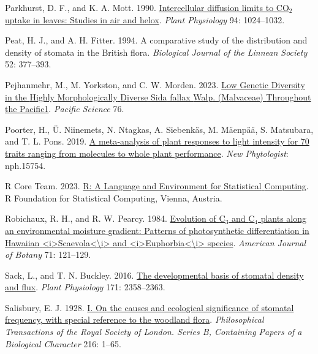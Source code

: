 \documentclass[
  letterpaper,
  DIV=11,
  numbers=noendperiod]{scrartcl}
\newlength{\cslhangindent}
\newlength{\cslentryspacingunit} %
\newenvironment{CSLReferences}[2] %
 {%
  \setlength{\parindent}{0pt}
  \ifodd #1
  \let\oldpar\par
  \def\par{\hangindent=\cslhangindent\oldpar}
  \fi
  \setlength{\parskip}{#2\cslentryspacingunit}
 }%
 {}
\begin{document}
\begin{CSLReferences}{1}{0}
\leavevmode{}%
Parkhurst, D. F., and K. A. Mott. 1990.
\href{https://doi.org/10.1104/pp.94.3.1024}{Intercellular diffusion
limits to {CO}\(_{\textrm{2}}\) uptake in leaves: Studies in air and
helox}. \emph{Plant Physiology} 94: 1024--1032.

\leavevmode{}%
Peat, H. J., and A. H. Fitter. 1994. A comparative study of the
distribution and density of stomata in the {British} flora.
\emph{Biological Journal of the Linnean Society} 52: 377--393.

\leavevmode{}%
Pejhanmehr, M., M. Yorkston, and C. W. Morden. 2023.
\href{https://doi.org/10.2984/76.4.2}{Low {Genetic} {Diversity} in the
{Highly} {Morphologically} {Diverse} {Sida} fallax {Walp}. ({Malvaceae})
{Throughout} the {Pacific1}}. \emph{Pacific Science} 76.

\leavevmode{}%
Poorter, H., Ü. Niinemets, N. Ntagkas, A. Siebenkäs, M. Mäenpää, S.
Matsubara, and T. L. Pons. 2019.
\href{https://doi.org/10.1111/nph.15754}{A meta‐analysis of plant
responses to light intensity for 70 traits ranging from molecules to
whole plant performance}. \emph{New Phytologist}: nph.15754.

\leavevmode{}%
R Core Team. 2023. \href{http://www.R-project.org/}{R: {A} {Language}
and {Environment} for {Statistical} {Computing}}. R Foundation for
Statistical Computing, Vienna, Austria.

\leavevmode{}%
Robichaux, R. H., and R. W. Pearcy. 1984.
\href{https://doi.org/10.1002/j.1537-2197.1984.tb12492.x}{Evolution of
{C}\(_{\textrm{3}}\) and {C}\(_{\textrm{4}}\) plants along an
environmental moisture gradient: Patterns of photosynthetic
differentiation in {Hawaiian}
{\textless{}}i{\textgreater{}}{Scaevola}{\textless{}}{\textbackslash{}}i{\textgreater{}}
and
{\textless{}}i{\textgreater{}}{Euphorbia}{\textless{}}{\textbackslash{}}i{\textgreater{}}
species}. \emph{American Journal of Botany} 71: 121--129.

\leavevmode{}%
Sack, L., and T. N. Buckley. 2016.
\href{https://doi.org/10.1104/pp.16.00476}{The developmental basis of
stomatal density and flux}. \emph{Plant Physiology} 171: 2358--2363.

\leavevmode{}%
Salisbury, E. J. 1928. \href{https://doi.org/10.1098/rstb.1928.0001}{I.
{On} the causes and ecological significance of stomatal frequency, with
special reference to the woodland flora}. \emph{Philosophical
Transactions of the Royal Society of London. Series B, Containing Papers
of a Biological Character} 216: 1--65.


\end{CSLReferences}
\end{document}
